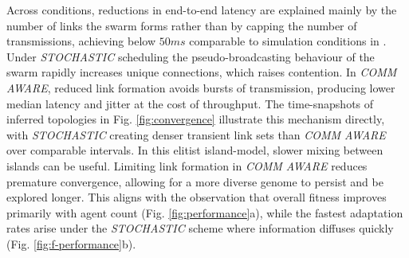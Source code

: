 \documentclass[conference]{IEEEtran}
\begin{document}
Across conditions, reductions in end-to-end latency are explained mainly by the number of links the swarm forms rather than by capping the number of transmissions, achieving below $50ms$ comparable to simulation conditions in \cite{hauert_evolved_2009}. Under \emph{STOCHASTIC} scheduling the pseudo-broadcasting behaviour of the swarm rapidly increases unique connections, which raises contention. In \emph{COMM AWARE}, reduced link formation avoids bursts of transmission, producing lower median latency and jitter at the cost of throughput. The time-snapshots of inferred topologies in Fig. \ref{fig:convergence} illustrate this mechanism directly, with \emph{STOCHASTIC} creating denser transient link sets than \emph{COMM AWARE} over comparable intervals. In this elitist island-model, slower mixing between islands can be useful. Limiting link formation in \emph{COMM AWARE} reduces premature convergence, allowing for a more diverse genome to persist and be explored longer. This aligns with the observation that overall fitness improves primarily with agent count (Fig. \ref{fig:performance}a), while the fastest adaptation rates arise under the \emph{STOCHASTIC} scheme where information diffuses quickly (Fig. \ref{fig:f-performance}b).\\

\end{document}
